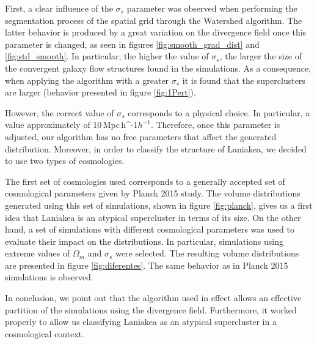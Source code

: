 \documentclass[usenatbib]{mnras}
\newcommand{\Mpch}{\,{\rm Mpc}\,\ifmmode h^{-1}\else $h^{-1}$\fi}
\begin{document}
First, a clear influence of the $\sigma_s$ parameter was observed when performing the segmentation process of the spatial grid through the Watershed algorithm. The latter behavior is produced by a great variation on the divergence field once this parameter is changed, as seen in figures \ref{fig:smooth_grad_dist} and \ref{fig:std_smooth}. In particular, the higher the value of $\sigma_s$, the larger the size of the convergent galaxy flow structures found in the simulations. As a consequence, when applying the algorithm with a greater $\sigma_s$ it is found that the superclusters are larger (behavior presented in figure \ref{fig:1Pert}).

However, the correct value of $\sigma_s$ corresponds to a physical choice. In particular, a value approximately of 10\Mpch. Therefore, once this parameter is adjusted, our algorithm has no free parameters that affect the generated distribution. Moreover, in order to classify the structure of Laniakea, we decided to use two types of cosmologies. 

The first set of cosmologies used corresponds to a generally accepted set of cosmological parameters given by Planck 2015 study. The volume distributions generated using this set of simulations, shown in figure \ref{fig:planck}, gives us a first idea that Laniakea is an atypical supercluster in terms of its size. On the other hand, a set of simulations with different cosmological parameters was used to evaluate their impact on the distributions. In particular, simulations using extreme values of $\Omega_m$ and $\sigma_s$ were selected. The resulting volume distributions are presented in figure \ref{fig:diferentes}. The same behavior as in Planck 2015 simulations is observed. 

In conclusion, we point out that the algorithm used in effect allows an effective partition of the simulations using the divergence field. Furthermore, it worked properly to allow us classifying Laniakea as an atypical supercluster in a cosmological context.






\end{document}
